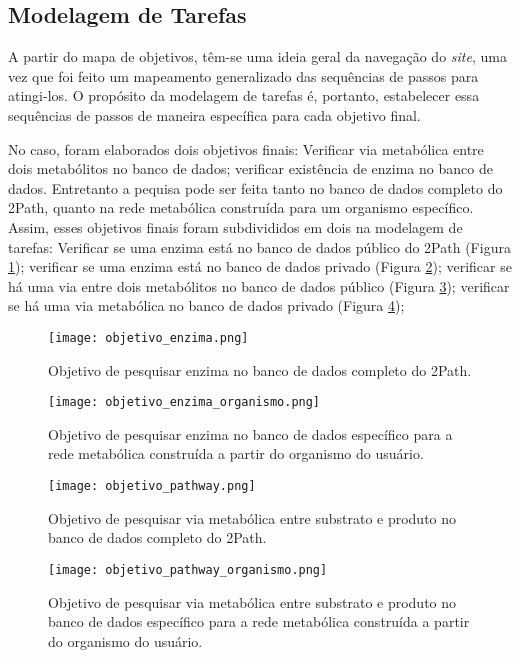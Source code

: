 \subsection{Modelagem de Tarefas}

\indent A partir do mapa de objetivos, têm-se uma ideia geral da navegação do \textit{site}, uma vez que foi feito um mapeamento generalizado das sequências de passos para atingi-los. O propósito da modelagem de tarefas é, portanto, estabelecer essa sequências de passos de maneira específica para cada objetivo final. 

\indent No caso, foram elaborados dois objetivos finais: Verificar via metabólica entre dois metabólitos no banco de dados; verificar existência de enzima no banco de dados. Entretanto a pequisa pode ser feita tanto no banco de dados completo do 2Path, quanto na rede metabólica construída para um organismo específico. Assim, esses objetivos finais foram subdivididos em dois na modelagem de tarefas: Verificar se uma enzima está no banco de dados público do 2Path (Figura \ref{fig:objetivo_enzyma}); verificar se uma enzima está no banco de dados privado (Figura \ref{fig:objetivo_enzyma_organismo}); verificar se há uma via entre dois metabólitos no banco de dados público (Figura \ref{fig:objetivo_pathway}); verificar se há uma via metabólica no banco de dados privado (Figura \ref{fig:objetivo_pathway_organismo});

\begin{figure}[!h]
    \centering
    \texttt{[image: objetivo\_enzima.png]}
    \caption{Objetivo de pesquisar enzima no banco de dados completo do 2Path.}
    \label{fig:objetivo_enzyma}
\end{figure}

\newpage
\begin{figure}[!h]
    \centering
    \texttt{[image: objetivo\_enzima\_organismo.png]}
    \caption{Objetivo de pesquisar enzima no banco de dados específico para a rede metabólica construída a partir do organismo do usuário.}
    \label{fig:objetivo_enzyma_organismo}
\end{figure}

\begin{figure}[!h]
    \centering
    \texttt{[image: objetivo\_pathway.png]}
    \caption{Objetivo de pesquisar via metabólica entre substrato e produto no banco de dados completo do 2Path.}
    \label{fig:objetivo_pathway}
\end{figure}
\break
\begin{figure}[!h]
    \centering
    \texttt{[image: objetivo\_pathway\_organismo.png]}
    \caption{Objetivo de pesquisar via metabólica entre substrato e produto no banco de dados  específico para a rede metabólica construída a partir do organismo do usuário.}
    \label{fig:objetivo_pathway_organismo}
\end{figure}

